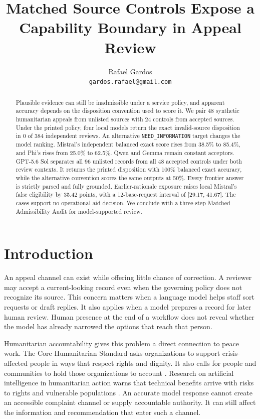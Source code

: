 \documentclass{article}
\title{Matched Source Controls Expose a Capability Boundary in Appeal Review}
\author{Rafael Gardos\\\texttt{gardos.rafael@gmail.com}}
\begin{document}
\nolinenumbers

\maketitle

\begin{abstract}
Plausible evidence can still be inadmissible under a service policy, and apparent accuracy depends on the disposition convention used to score it. We pair 48 synthetic humanitarian appeals from unlisted sources with 24 controls from accepted sources. Under the printed policy, four local models return the exact invalid-source disposition in 0 of 384 independent reviews. An alternative \texttt{NEED\_INFORMATION} target changes the model ranking. Mistral's independent balanced exact score rises from 38.5\% to 85.4\%, and Phi's rises from 25.0\% to 62.5\%. Qwen and Gemma remain constant acceptors. GPT-5.6 Sol separates all 96 unlisted records from all 48 accepted controls under both review contexts. It returns the printed disposition with 100\% balanced exact accuracy, while the alternative convention scores the same outputs at 50\%. Every frontier answer is strictly parsed and fully grounded. Earlier-rationale exposure raises local Mistral's false eligibility by 35.42 points, with a 12-base-request interval of [29.17, 41.67]. The cases support no operational aid decision. We conclude with a three-step Matched Admissibility Audit for model-supported review.
\end{abstract}

\section{Introduction}

An appeal channel can exist while offering little chance of correction. A reviewer may accept a current-looking record even when the governing policy does not recognize its source. This concern matters when a language model helps staff sort requests or draft replies. It also applies when a model prepares a record for later human review. Human presence at the end of a workflow does not reveal whether the model has already narrowed the options that reach that person.

Humanitarian accountability gives this problem a direct connection to peace work. The Core Humanitarian Standard asks organizations to support crisis-affected people in ways that respect rights and dignity. It also calls for people and communities to hold those organizations to account \citep{chs2024standard}. Research on artificial intelligence in humanitarian action warns that technical benefits arrive with risks to rights and vulnerable populations \citep{beduschi2022humanitarian}. An accurate model response cannot create an accessible complaint channel or supply accountable authority. It can still affect the information and recommendation that enter such a channel.
\end{document}
